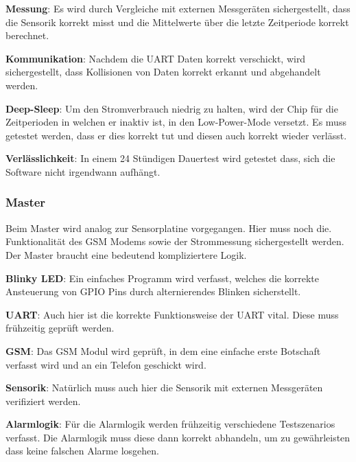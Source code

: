 \textbf{Messung}: Es   wird  durch   Vergleiche  mit   externen  Messger\"aten
sichergestellt, dass die Sensorik korrekt misst und die Mittelwerte \"uber die
letzte Zeitperiode korrekt berechnet.

\textbf{Kommunikation}: Nachdem  die  UART   Daten  korrekt  verschickt,  wird
sichergestellt,  dass Kollisionen  von Daten  korrekt erkannt  und abgehandelt
werden.

\textbf{Deep-Sleep}: Um den  Stromverbrauch niedrig  zu halten, wird  der Chip
f\"ur  die Zeitperioden  in  welchen  er inaktiv  ist,  in den  Low-Power-Mode
versetzt. Es muss  getestet werden, dass er  dies korrekt tut und  diesen auch
korrekt wieder verl\"asst.

\textbf{Verl\"asslichkeit}: In  einem 24  St\"undigen Dauertest  wird getestet
dass, sich die Software nicht irgendwann aufh\"angt.

\subsubsection{Master}

Beim Master  wird analog  zur Sensorplatine  vorgegangen. Hier muss  noch die.
Funktionalit\"at des GSM Modems  sowie der Strommessung sichergestellt werden.
Der Master braucht eine bedeutend kompliziertere Logik.

\textbf{Blinky  LED}: Ein  einfaches  Programm   wird  verfasst,  welches  die
korrekte Ansteuerung von GPIO Pins durch alternierendes Blinken sicherstellt.

\textbf{UART}: Auch hier ist die korrekte Funktionsweise der UART vital. Diese
muss fr\"uhzeitig gepr\"uft werden.

\textbf{GSM}: Das  GSM  Modul  wird  gepr\"uft, in  dem  eine  einfache  erste
Botschaft verfasst wird und an ein Telefon geschickt wird.

\textbf{Sensorik}: Nat\"urlich  muss  auch  hier  die  Sensorik  mit  externen
Messger\"aten verifiziert werden.

\textbf{Alarmlogik}: F\"ur  die  Alarmlogik werden  fr\"uhzeitig  verschiedene
Testszenarios verfasst. Die  Alarmlogik muss diese dann  korrekt abhandeln, um
zu gew\"ahrleisten dass keine falschen Alarme losgehen.
